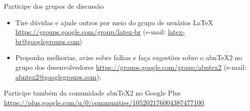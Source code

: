 \begin{frame}{Participe dos grupos de discussão}

\begin{itemize}
  \item Tire dúvidas e ajude outros por meio do grupo de usuários LaTeX
  \url{https://groups.google.com/group/latex-br} (e-mail:
  \url{latex-br@googlegroups.com})
  
  \item Proponha melhorias, avise sobre falhas e faça sugestões sobre o abnTeX2
  no grupo dos desenvolvedores \url{https://groups.google.com/group/abntex2}
  (e-mail: \url{abntex2@googlegroups.com});
\end{itemize}

Participe também da comunidade abnTeX2 no Google Plus
\url{https://plus.google.com/u/0/communities/105202176004387477100}.

\end{frame}
